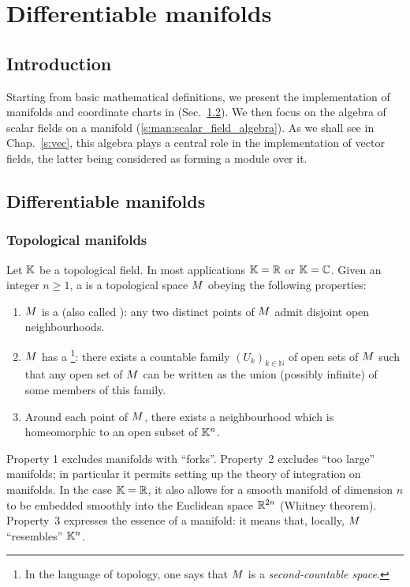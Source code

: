 \chapter{Differentiable manifolds} \label{s:man}

\minitoc

\section{Introduction}

Starting from basic mathematical definitions, we present
the implementation of manifolds and coordinate charts in \Sage{}
(Sec.~\ref{s:bas:manif}).
We then focus on the algebra of scalar fields on a manifold (\ref{s:man:scalar_field_algebra}).
As we shall see in Chap.~\ref{s:vec}, this algebra plays a central role in the implementation of vector fields, the latter being considered as forming a module
over it.

\section{Differentiable manifolds} \label{s:bas:manif}

\subsection{Topological manifolds} \label{s:bas:def_manif}

Let $\mathbb{K}$ be a topological field. In most applications $\mathbb{K}=\mathbb{R}$ or $\mathbb{K}=\mathbb{C}$.
Given an integer $n\geq 1$, a  is a topological space $M$ obeying the following properties:
\begin{enumerate}
\item $M$ is a  (also called ): any two distinct points of $M$
admit disjoint open neighbourhoods.
\item $M$ has a \footnote{In the language of topology, one says that $M$ is a \emph{second-countable space}.}:
there exists a countable family
$(U_k)_{k\in\mathbb{N}}$ of open sets of $M$ such that any open set of $M$ can be written as the union (possibly infinite) of some members of this family.
\item Around each point of $M$, there exists a neighbourhood which is
homeomorphic to an open subset of $\mathbb{K}^n$.
\end{enumerate}
Property 1 excludes manifolds with ``forks''.
Property~2 excludes ``too large'' manifolds; in particular it permits setting
up the theory of integration on manifolds. In the case $\mathbb{K}=\mathbb{R}$, it also
allows for a smooth manifold of dimension $n$ to be embedded smoothly into the Euclidean space $\mathbb{R}^{2n}$
(Whitney theorem).
Property~3 expresses the essence of a manifold: it means that, locally,
$M$ ``resembles'' $\mathbb{K}^n$.

